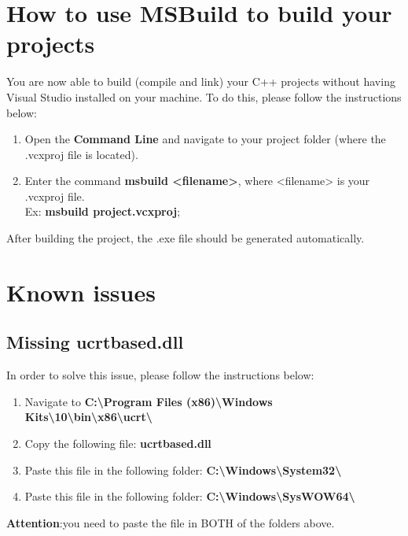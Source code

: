 \section{How to use MSBuild to build your projects}
  You are now able to build (compile and link) your C++ projects without having Visual Studio installed on your machine.
  To do this, please follow the instructions below:
  \begin{enumerate}
    \item Open the \textbf{Command Line} and navigate to your project folder (where the .vcxproj file is located).
    \item Enter the command \textbf{msbuild <filename>}, where <filename> is your .vcxproj file. \\Ex: \textbf{msbuild project.vcxproj};
  \end{enumerate}
  After building the project, the .exe file should be generated automatically.
\section{Known issues}
  \subsection{Missing ucrtbased.dll}
  In order to solve this issue, please follow the instructions below:
  \begin{enumerate}
     \item Navigate to \textbf{C:\textbackslash{}Program Files (x86)\textbackslash{}Windows Kits\textbackslash{}10\textbackslash{}bin\textbackslash{}x86\textbackslash{}ucrt\textbackslash{}}
     \item Copy the following file: \textbf{ucrtbased.dll}
     \item Paste this file in the following folder: \textbf{C:\textbackslash{}Windows\textbackslash{}System32\textbackslash{}}
     \item Paste this file in the following folder: \textbf{C:\textbackslash{}Windows\textbackslash{}SysWOW64\textbackslash{}}
   \end{enumerate}
   \textbf{Attention}:you need to paste the file in BOTH of the folders above.
   